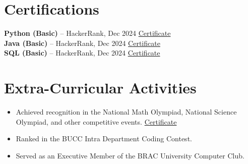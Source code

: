 \documentclass[11pt,a4paper]{article}
\begin{document}
\section*{Certifications}
\textbf{Python (Basic)} -- HackerRank, Dec 2024 \hfill \href{https://www.hackerrank.com/certificates/iframe/24b1f60bb693}{Certificate}\\
\textbf{Java (Basic)} -- HackerRank, Dec 2024 \hfill \href{https://www.hackerrank.com/certificates/iframe/a0d20cadec4f}{Certificate}\\
\textbf{SQL (Basic)} -- HackerRank, Dec 2024 \hfill \href{https://www.hackerrank.com/certificates/iframe/4728ab6b6d96}{Certificate}

\section*{Extra-Curricular Activities}
\begin{itemize}
    \item Achieved recognition in the National Math Olympiad, National Science Olympiad, and other competitive events. \href{https://drive.google.com/file/d/16LspK1plSKVER3VEShbUcWfIE3-jeLkt/view?usp=sharing}{Certificate}
    \item Ranked in the BUCC Intra Department Coding Contest.
    \item Served as an Executive Member of the BRAC University Computer Club.
\end{itemize}
\end{document}
